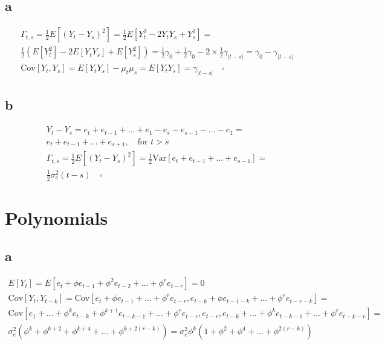 \documentclass[]{book}
\theoremstyle{definition}
\theoremstyle{definition}
\theoremstyle{remark}
\begin{document}
\subsection*{a}\label{a-17}

\begin{gather*}
  \Gamma_{t,s} = \frac{1}{2}E[(Y_t-Y_s)^2] = \frac{1}{2}E[Y_t^2 - 2Y_t Y_s + Y_s^2] = \\
  \frac{1}{2}\left( E[Y_t^2] - 2E[Y_t Y_s] + E[Y_s^2] \right) = \frac{1}{2}\gamma_0 + \frac{1}{2}\gamma_0 - 2 \times \frac{1}{2}\gamma_{|t-s|} = \gamma_0 - \gamma_{|t-s|}\\
  \text{Cov}[Y_t,Y_s] = E[Y_tY_s]-\mu_t\mu_s=E[Y_tY_s]=\gamma_{|t-s|} \quad \square
\end{gather*}

\subsection*{b}\label{b-17}

\begin{gather*}
  Y_t-Y_s = e_t + e_{t-1} + \dots + e_1 - e_s - e_{s-1} - \dots - e_1 = \\
  e_t + e_{t-1} + \dots + e_{s+1}, \quad \text{for } t > s \\
  \Gamma_{t,s} = \frac{1}{2}E[(Y_t-Y_s)^2] = \frac{1}{2}\text{Var}[e_t + e_{t-1} + \dots + e_{s-1}] =\\ \frac{1}{2}\sigma_e^2(t-s) \quad \square
\end{gather*}

\section{Polynomials}\label{polynomials}

\subsection*{a}\label{a-18}

\begin{gather*}
  E[Y_t] = E[e_t + \phi e_{t-1} + \phi^2 e_{t-2} + \dots + \phi^r e_{t-r}] = 0\\
  \text{Cov}[Y_t, Y_{t-k}] = \text{Cov}[e_t + \phi e_{t-1} + \dots +
    \phi^r e_{t-r}, e_{t-k} + \phi e_{t-1-k} + \dots + \phi^r e_{t-r-k}] =\\
  \text{Cov}[e_1+\dots + \phi^k e_{t-k} + \phi^{k+1}e_{t-k-1} +
    \dots + \phi^r e_{t-r}, e_{t-r}, e_{t-k} + \dots + \phi^k e_{t-k-1} + \dots + \phi^r e_{t-k-r}] = \\
  \sigma_e^2(\phi^k + \phi^{k+2} + \phi^{k+4} + \dots + \phi^{k+2(r-k)}) = \sigma_e^2 \phi^k(1 + \phi^2 + \phi^4 + \dots + \phi^{2(r-k)})
\end{gather*}
\end{document}
